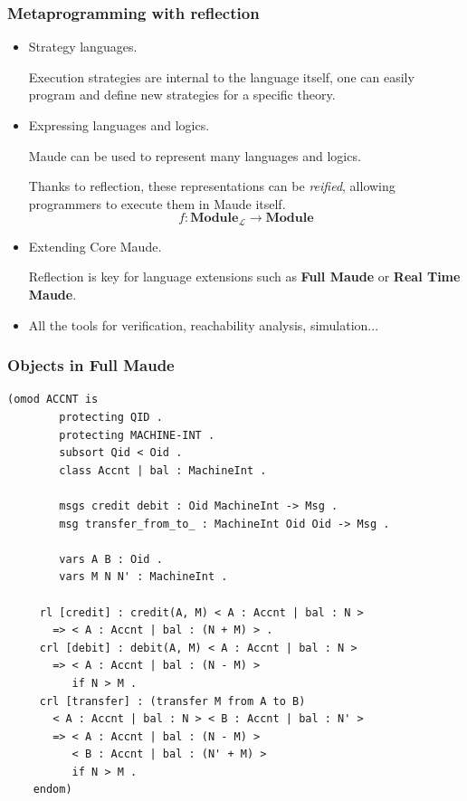 \documentclass{beamer}
\begin{document}
\begin{frame}
    
    \frametitle{Metaprogramming with reflection}
    \small
    \begin{itemize}
        \item Strategy languages. 
        
        Execution strategies are internal to the language itself, one can easily program 
        and define new strategies for a specific theory.
        
        \item Expressing languages and logics. 
        
        Maude can be used to represent many languages and logics. 
    
        Thanks to reflection, these representations can be \emph{reified}, allowing programmers 
        to execute them in Maude itself. 
        $$f:\mathbf{Module_\mathcal{L}} \rightarrow \mathbf{Module}$$
        
        
        \item Extending Core Maude.
        
        Reflection is key for language extensions such as \textbf{Full Maude} or \textbf{Real Time Maude}.
        
        \item All the tools for verification, reachability analysis, simulation...
    \end{itemize}
\end{frame}
\begin{frame}[fragile]
    \scriptsize
    \frametitle{Objects in Full Maude}
    \begin{lstlisting}[language=maude]
    (omod ACCNT is 
        protecting QID .
        protecting MACHINE-INT .
        subsort Qid < Oid .
        class Accnt | bal : MachineInt .  
        
        msgs credit debit : Oid MachineInt -> Msg .  
        msg transfer_from_to_ : MachineInt Oid Oid -> Msg .  

        vars A B : Oid . 
        vars M N N' : MachineInt .  

     rl [credit] : credit(A, M) < A : Accnt | bal : N >
       => < A : Accnt | bal : (N + M) > .  
     crl [debit] : debit(A, M) < A : Accnt | bal : N >
       => < A : Accnt | bal : (N - M) >
          if N > M .  
     crl [transfer] : (transfer M from A to B)
       < A : Accnt | bal : N > < B : Accnt | bal : N' > 
       => < A : Accnt | bal : (N - M) > 
          < B : Accnt | bal : (N' + M) >
          if N > M . 
    endom)
    \end{lstlisting}
\end{frame}
\end{document}
